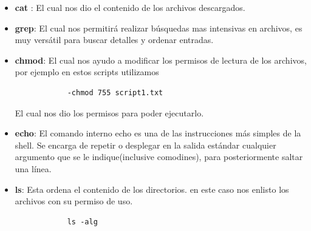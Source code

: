 \documentclass[12pt,letterpaper]{article}
\begin{document}
            \begin{itemize}
            \item\textbf{cat} : El cual nos dio el contenido de los archivos descargados.
            \end{itemize}

            \begin{itemize}
            \item\textbf{grep}: El cual nos permitirá realizar búsquedas mas intensivas en archivos, es muy versátil para buscar detalles y ordenar entradas.
 			\end{itemize}
           
            \begin{itemize}
            \item\textbf{chmod}: El cual nos ayudo a modificar los permisos de lectura de los archivos, por ejemplo en estos scripts utilizamos 	
            \begin{verbatim}
  			-chmod 755 script1.txt
            \end{verbatim}
            El cual nos dio los permisos para poder ejecutarlo.
			\end{itemize}
            
            \begin{itemize}
            \item\textbf{echo}: El comando interno echo es una de las instrucciones más simples de la shell. Se encarga de repetir o desplegar en la salida estándar cualquier argumento que se le indique(inclusive comodines), para posteriormente saltar una línea.
			\end{itemize}
            
            \begin{itemize}
            \item\textbf{ls}: Esta ordena el contenido de los directorios. en este caso nos enlisto los archivos con su permiso de uso.
            \begin{verbatim}
            ls -alg
            \end{verbatim}
			\end{itemize}
            
\end{document}
